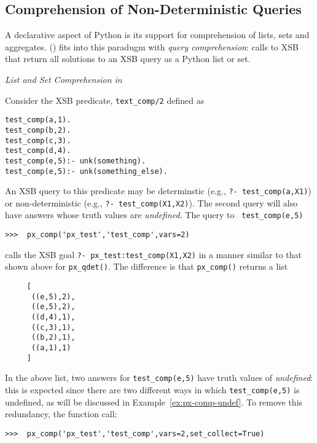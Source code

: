 \subsection{Comprehension of Non-Deterministic Queries}

A declarative aspect of Python is its support for comprehension of
lists, sets and aggregates.  \px() fits into this paradugm with {\em
  query comprehension}: calls to XSB that return all solutions to an
XSB query as a Python list or set.

\begin{example} \rm {\it List and Set Comprehension in \px{}}

  Consider the XSB predicate, {\tt text\_comp/2} defined as

{\small  
\begin{verbatim}  
test_comp(a,1).
test_comp(b,2).
test_comp(c,3).
test_comp(d,4).
test_comp(e,5):- unk(something).
test_comp(e,5):- unk(something_else).
\end{verbatim}
}

\noindent
An XSB query to this predicate may be determinstic (e.g., {\tt ?-
  test\_comp(a,X1)}) or non-deterministic (e.g., {\tt ?-
  test\_comp(X1,X2)}).  The second query will also have answers whose
truth values are {\em undefined}.  The \px{} query to {\tt
  test\_comp(e,5)}

\begin{verbatim}
>>>  px_comp('px_test','test_comp',vars=2)
\end{verbatim}

\noindent
calls the XSB goal {\tt ?- px\_test:test\_comp(X1,X2)} in a manner
similar to that shown above for {\tt px\_qdet()}.  The difference is
that {\tt px\_comp()} returns a list

{\small  
\begin{verbatim}
     [
      ((e,5),2),
      ((e,5),2),
      ((d,4),1),
      ((c,3),1),
      ((b,2),1),
      ((a,1),1) 
     ]
\end{verbatim}
}

\noindent
In the above list, two answers for {\tt test\_comp(e,5)} have truth
values of {\em undefined}: this is expected since there are two
different ways in which {\tt test\_comp(e,5)} is undefined, as will be
discussed in Example~\ref{ex:px-comp-undef}.  To remove this
redundancy, the function call:

\begin{verbatim}
>>>  px_comp('px_test','test_comp',vars=2,set_collect=True)
\end{verbatim}


\end{example}
